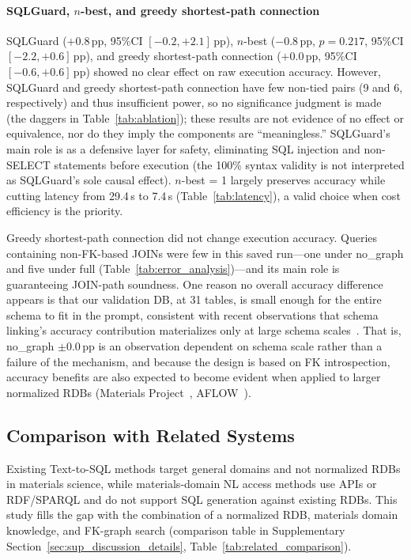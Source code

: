 \paragraph*{SQLGuard, $n$-best, and greedy shortest-path connection}
SQLGuard ($+$0.8\,pp, 95\%CI $[-0.2, +2.1]$\,pp), $n$-best ($-$0.8\,pp, $p=0.217$, 95\%CI $[-2.2, +0.6]$\,pp), and greedy shortest-path connection ($+$0.0\,pp, 95\%CI $[-0.6, +0.6]$\,pp) showed no clear effect on raw execution accuracy. However, SQLGuard and greedy shortest-path connection have few non-tied pairs (9 and 6, respectively) and thus insufficient power, so no significance judgment is made (the daggers in Table~\ref{tab:ablation}); these results are not evidence of no effect or equivalence, nor do they imply the components are ``meaningless.'' SQLGuard's main role is as a defensive layer for safety, eliminating SQL injection and non-SELECT statements before execution (the 100\% syntax validity is not interpreted as SQLGuard's sole causal effect). $n$-best = 1 largely preserves accuracy while cutting latency from 29.4\,s to 7.4\,s (Table~\ref{tab:latency}), a valid choice when cost efficiency is the priority.

Greedy shortest-path connection did not change execution accuracy. Queries containing non-FK-based JOINs were few in this saved run---one under no\_graph and five under full (Table~\ref{tab:error_analysis})---and its main role is guaranteeing JOIN-path soundness. One reason no overall accuracy difference appears is that our validation DB, at 31 tables, is small enough for the entire schema to fit in the prompt, consistent with recent observations that schema linking's accuracy contribution materializes only at large schema scales~\cite{maamari2024schema}. That is, no\_graph $\pm$0.0\,pp is an observation dependent on schema scale rather than a failure of the mechanism, and because the design is based on FK introspection, accuracy benefits are also expected to become evident when applied to larger normalized RDBs (Materials Project~\cite{jain2013mp}, AFLOW~\cite{curtarolo2012aflow}).
\subsection{Comparison with Related Systems}

Existing Text-to-SQL methods target general domains and not normalized RDBs in materials science, while materials-domain NL access methods use APIs or RDF/SPARQL and do not support SQL generation against existing RDBs. This study fills the gap with the combination of a normalized RDB, materials domain knowledge, and FK-graph search (comparison table in Supplementary Section~\ref{sec:sup_discussion_details}, Table~\ref{tab:related_comparison}).

